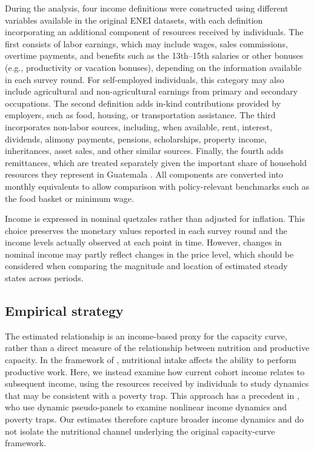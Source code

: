 \documentclass{article}
\begin{document}
During the analysis, four income definitions were constructed using different variables available in the original ENEI datasets, with each definition incorporating an additional component of resources received by individuals. The first consists of labor earnings, which may include wages, sales commissions, overtime payments, and benefits such as the 13th–15th salaries or other bonuses (e.g., productivity or vacation bonuses), depending on the information available in each survey round. For self-employed individuals, this category may also include agricultural and non-agricultural earnings from primary and secondary occupations. The second definition adds in-kind contributions provided by employers, such as food, housing, or transportation assistance. The third incorporates non-labor sources, including, when available, rent, interest, dividends, alimony payments, pensions, scholarships, property income, inheritances, asset sales, and other similar sources. Finally, the fourth adds remittances, which are treated separately given the important share of household resources they represent in Guatemala \parencite{iom2022remittances,banguat2026remittances}. All components are converted into monthly equivalents to allow comparison with policy-relevant benchmarks such as the food basket or minimum wage. 

Income is expressed in nominal quetzales rather than adjusted for inflation. This choice preserves the monetary values reported in each survey round and the income levels actually observed at each point in time. However, changes in nominal income may partly reflect changes in the price level, which should be considered when comparing the magnitude and location of estimated steady states across periods.

\subsection{Empirical strategy}

The estimated relationship is an income-based proxy for the capacity curve, rather than a direct measure of the relationship between nutrition and productive capacity. In the framework of \textcite{dasgupta1986}, nutritional intake affects the ability to perform productive work. Here, we instead examine how current cohort income relates to subsequent income, using the resources received by individuals to study dynamics that may be consistent with a poverty trap. This approach has a precedent in \textcite{antman2007}, who use dynamic pseudo-panels to examine nonlinear income dynamics and poverty traps. Our estimates therefore capture broader income dynamics and do not isolate the nutritional channel underlying the original capacity-curve framework.
\end{document}
